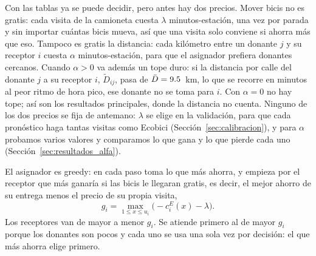 \documentclass[conference,letterpaper,10pt]{IEEEtran}
\begin{document}
Con las tablas ya se puede decidir, pero antes hay dos precios. Mover bicis no es gratis: cada visita de la camioneta cuesta $\lambda$ minutos-estación, una vez por parada y sin importar cuántas bicis mueva, así que una visita solo conviene si ahorra más que eso. Tampoco es gratis la distancia: cada kilómetro entre un donante $j$ y su receptor $i$ cuesta $\alpha$ minutos-estación, para que el asignador prefiera donantes cercanos. Cuando $\alpha>0$ va además un tope duro: si la distancia por calle del donante $j$ a su receptor $i$, $\tilde D_{ij}$, pasa de $\bar D=9.5$~km, lo que se recorre en \tfLimMin{} minutos al peor ritmo de hora pico, ese donante no se toma para $i$. Con $\alpha=0$ no hay tope; así son los resultados principales, donde la distancia no cuenta. Ninguno de los dos precios se fija de antemano: $\lambda$ se elige en la validación, para que cada pronóstico haga tantas visitas como Ecobici (Sección~\ref{sec:calibracion}), y para $\alpha$ probamos varios valores y comparamos lo que gana y lo que pierde cada uno (Sección~\ref{sec:resultados_alfa}).

El asignador es greedy: en cada paso toma lo que más ahorra, y empieza por el receptor que más ganaría si las bicis le llegaran gratis, es decir, el mejor ahorro de su entrega menos el precio de su propia visita,
\begin{equation}\label{eq:g}
g_i=\max_{1\le x\le u_i}\bigl(-c^E_i(x)-\lambda\bigr).
\end{equation}
Los receptores van de mayor a menor $g_i$. Se atiende primero al de mayor $g_i$ porque los donantes son pocos y cada uno se usa una sola vez por decisión: el que más ahorra elige primero.
\end{document}
